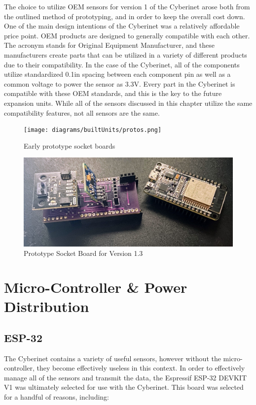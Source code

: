 The choice to utilize OEM sensors for version 1 of the Cyberinet arose both from the outlined method of prototyping, and in order to keep the overall cost down. One of the main design intentions of the Cyberinet was a relatively affordable price point. OEM products are designed to generally compatible with each other. The acronym stands for Original Equipment Manufacturer, and these manufacturers create parts that can be utilized in a variety of different products due to their compatibility. In the case of the Cyberinet, all of the components utilize standardized 0.1in spacing between each component pin as well as a common voltage to power the sensor as 3.3V. Every part in the Cyberinet is compatible with these OEM standards, and this is the key to the future expansion units. While all of the sensors discussed in this chapter utilize the same compatibility features, not all sensors are the same.

\begin{figure}
    \centering
    \texttt{[image: diagrams/builtUnits/protos.png]}
    \caption{Early prototype socket boards}
    \label{fig:protoBoard}
\end{figure}


\begin{figure}
    \centering
    \includegraphics[scale=0.15]{diagrams/builtUnits/protoBoard.JPG}
    \caption{Prototype Socket Board for Version 1.3}
    \label{fig:protoBoard2}
\end{figure}

\section{Micro-Controller \& Power Distribution}

\subsection{ESP-32}
The Cyberinet contains a variety of useful sensors, however without the micro-controller, they become effectively useless in this context. In order to effectively manage all of the sensors and transmit the data, the Espressif ESP-32 DEVKIT V1 was ultimately selected for use with the Cyberinet. This board was selected for a handful of reasons, including:

